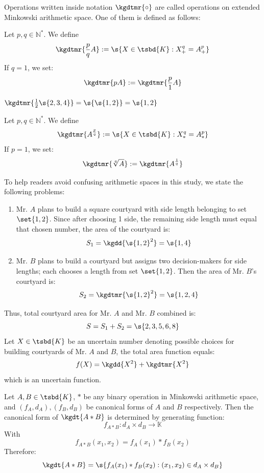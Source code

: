 \par{Operations written inside notation $\kgdtmr{\circ}$ are called operations on extended Minkowski arithmetic space. One of them is defined as follows:}
\begin{definition}
	Let $p,q \in \mathbb{N}^*$.
	We define \[\kgdtmr{\frac{p}{q}A} := \s{X \in \tsbd{K}: X^q_+ = A^p_+} \]
	If $q = 1$, we set: \[\kgdtmr{pA}:= \kgdtmr{\frac{p}{1} A} \]
\end{definition}
\begin{example}
	$\kgdtmr{\frac{1}{2} \s{2,3,4}} = \s{\s{1,2}} = \s{1,2}$
\end{example}
\begin{definition}
	Let $p,q \in \mathbb{N^*}$.
	We define \[\kgdtmr{A^{\frac{p}{q}}} := \s{X \in \tsbd{K}: X^q_* = A^p_*} \]
	If $p = 1$, we set: \[\kgdtmr{\sqrt[q]{A}} := \kgdtmr{A^{\frac{1}{q}}}\]
\end{definition}
\begin{example}
	To help readers avoid confusing arithmetic spaces in this study, we state the following problems:
	\begin{enumerate}
		\item Mr. $A$ plans to build a square courtyard with side length belonging to set $\set{1,2}$. Since after choosing 1 side, the remaining side length must equal that chosen number, the area of the courtyard is: \[S_1 = \kgdd{\s{1,2}^2} = \s{1,4}\]
		\item Mr. $B$ plans to build a courtyard but assigns two decision-makers for side lengths; each chooses a length from set $\set{1,2}$. Then the area of Mr. $B$'s courtyard is:
		\[S_2 = \kgdtmr{\s{1,2}^2} =\s{1,2,4}\]
	\end{enumerate}
	Thus, total courtyard area for Mr. $A$ and Mr. $B$ combined is:\[S= S_1 + S_2 = \s{2, 3, 5, 6, 8}\]
	Let $X \in \tsbd{K}$ be an uncertain number denoting possible choices for building courtyards of Mr. $A$ and $B$, the total area function equals:
	\[f(X) = \kgdd{X^2} + \kgdtmr{X^2}\] which is an uncertain function.
\end{example}
\begin{theorem}
	Let $A,B \in \tsbd{K}$, $*$ be any binary operation in Minkowski arithmetic space, and $(f_A,d_A), (f_B,d_B)$ be canonical forms of $A$ and $B$ respectively. Then the canonical form of $\kgdt{A * B}$ is determined by generating function:
	\[f_{A*B} : d_A \times d_B \to \mathbb{K}\]
	With \[f_{A*B}(x_1,x_2) = f_A(x_1) * f_B(x_2)\]
	Therefore: \[\kgdt{A*B} = \s{f_A(x_1)*f_B(x_2) : (x_1,x_2) \in d_A \times d_B}\]
\end{theorem}
